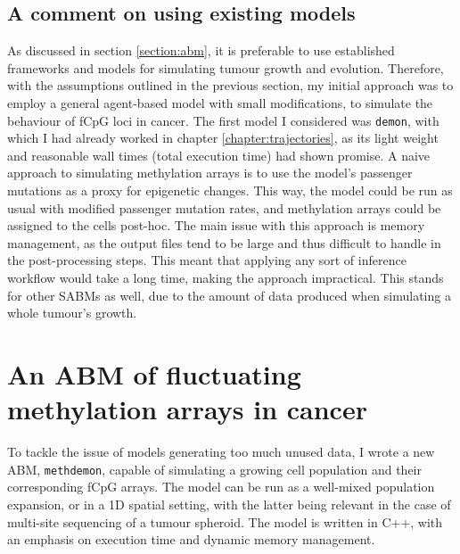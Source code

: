 \subsection{A comment on using existing models}\label{section:old_famework}

As discussed in section \ref{section:abm}, it is preferable to use established
frameworks and models for simulating tumour growth and evolution. Therefore,
with the assumptions outlined in the previous section, my initial approach was
to employ a general agent-based model with small modifications, to simulate the
behaviour of fCpG loci in cancer. The first model I considered was
\texttt{demon}, with which I had already worked in chapter
\ref{chapter:trajectories}, as its light weight and reasonable wall times
(total execution time) had shown promise. A naive approach to simulating
methylation arrays is to use the model's passenger mutations as a proxy for
epigenetic changes. This way, the model could be run as usual with modified
passenger mutation rates, and methylation arrays could be assigned to the cells
post-hoc. The main issue with this approach is memory management, as the output
files tend to be large and thus difficult to handle in the post-processing
steps. This meant that applying any sort of inference workflow would take a
long time, making the approach impractical. This stands for other SABMs as
well, due to the amount of data produced when simulating a whole tumour's
growth.

\section{An ABM of fluctuating methylation arrays in
cancer}\label{section:methdemon}
To tackle the issue of models generating too much unused data, I wrote a new
ABM, \texttt{methdemon}, capable of simulating a growing cell population and
their corresponding fCpG arrays. The model can be run as a well-mixed population
expansion, or in a 1D spatial setting, with the latter being relevant in the
case of multi-site sequencing of a tumour spheroid. The model is written in C++,
with an emphasis on execution time and dynamic memory management.

